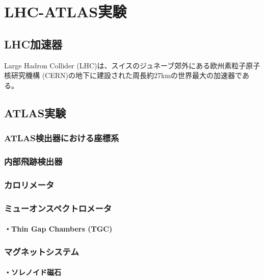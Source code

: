 \chapter{LHC-ATLAS実験}
\label{chapter2}

\section{LHC加速器}
\label{section2-1}

Large Hadron Collider (LHC)は、スイスのジュネーブ郊外にある欧州素粒子原子核研究機構 (CERN)の地下に建設された周長約27kmの世界最大の加速器である。


\section{ATLAS実験}
\label{section2-2}

\subsection{ATLAS検出器における座標系}


\subsection{内部飛跡検出器}

\subsection{カロリメータ}

\subsection{ミューオンスペクトロメータ}
\label{section2-2-4}

\subsubsection{・Thin Gap Chambers (TGC)}

\subsection{マグネットシステム}
\subsubsection{・ソレノイド磁石}




